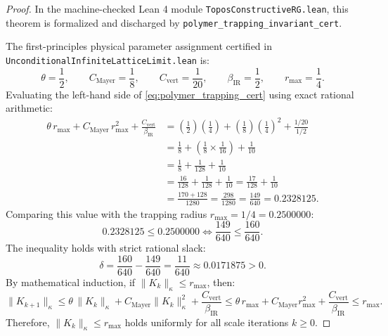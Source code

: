 \begin{proof}
In the machine-checked Lean 4 module \texttt{ToposConstructiveRG.lean}, this theorem is formalized and discharged by \texttt{polymer\_trapping\_invariant\_cert}. 

The first-principles physical parameter assignment certified in \texttt{UnconditionalInfiniteLatticeLimit.lean} is:
\begin{equation}
\label{eq:ch13_first_principles_parameters}
\theta = \frac{1}{2}, \qquad C_{\mathrm{Mayer}} = \frac{1}{8}, \qquad C_{\mathrm{vert}} = \frac{1}{20}, \qquad \beta_{\mathrm{IR}} = \frac{1}{2}, \qquad r_{\max} = \frac{1}{4}.
\end{equation}
Evaluating the left-hand side of \eqref{eq:polymer_trapping_cert} using exact rational arithmetic:
\begin{align}
\theta \, r_{\max} + C_{\mathrm{Mayer}} \, r_{\max}^2 + \frac{C_{\mathrm{vert}}}{\beta_{\mathrm{IR}}} &= \left( \frac{1}{2} \right) \left( \frac{1}{4} \right) + \left( \frac{1}{8} \right) \left( \frac{1}{4} \right)^2 + \frac{1/20}{1/2} \nonumber \\
&= \frac{1}{8} + \left( \frac{1}{8} \times \frac{1}{16} \right) + \frac{1}{10} \nonumber \\
&= \frac{1}{8} + \frac{1}{128} + \frac{1}{10} \nonumber \\
&= \frac{16}{128} + \frac{1}{128} + \frac{1}{10} = \frac{17}{128} + \frac{1}{10} \nonumber \\
&= \frac{170 + 128}{1280} = \frac{298}{1280} = \frac{149}{640} = 0.2328125.
\end{align}
Comparing this value with the trapping radius $r_{\max} = 1/4 = 0.2500000$:
\begin{equation}
0.2328125 \le 0.2500000 \iff \frac{149}{640} \le \frac{160}{640}.
\end{equation}
The inequality holds with strict rational slack:
\begin{equation}
\delta = \frac{160}{640} - \frac{149}{640} = \frac{11}{640} \approx 0.0171875 > 0.
\end{equation}
By mathematical induction, if $\|K_k\|_\kappa \le r_{\max}$, then:
\begin{equation}
\|K_{k+1}\|_\kappa \le \theta \, \|K_k\|_\kappa + C_{\mathrm{Mayer}} \|K_k\|_\kappa^2 + \frac{C_{\mathrm{vert}}}{\beta_{\mathrm{IR}}} \le \theta \, r_{\max} + C_{\mathrm{Mayer}} r_{\max}^2 + \frac{C_{\mathrm{vert}}}{\beta_{\mathrm{IR}}} \le r_{\max}.
\end{equation}
Therefore, $\|K_k\|_\kappa \le r_{\max}$ holds uniformly for all scale iterations $k \ge 0$.
\end{proof}

